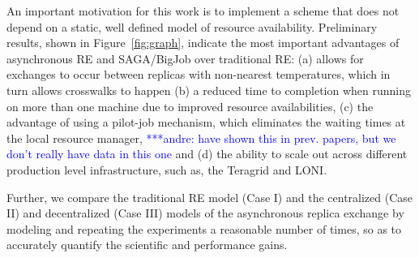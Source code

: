 \documentclass[a4paper,10pt]{article}
\newcommand{\jhanote}[1]{ {\textcolor{red} { ***shantenu: #1 }}}
\newcommand{\alnote}[1]{ {\textcolor{blue} { ***andre: #1 }}}
\newcommand{\athotanote}[1]{ {\textcolor{green} { ***athota: #1 }}}
\newcommand{\alnote}[1]{}
\newcommand{\jhanote}[1]{}
\newcommand{\athotanote}[1]{}
\begin{document}
An important motivation for this work is to implement a scheme that does not depend on a
static, well defined model of resource availability. %
Preliminary results, shown in Figure~\ref{fig:graph}, indicate the most important advantages of asynchronous RE and SAGA/BigJob over traditional RE: (a) allows for exchanges to occur between replicas with non-nearest temperatures, which in turn allows crosswalks to happen (b) a reduced time to completion when running on more than one machine due to improved resource availabilities, (c) the advantage of using a pilot-job mechanism, which eliminates the waiting times at the local resource manager, \alnote{have shown this in prev. papers, but we don't really have data in this one} and (d) the ability to scale out across different production level infrastructure, such as, the Teragrid and LONI.

Further, we compare the traditional RE model (Case I) and the centralized (Case II) and decentralized (Case III) models of the asynchronous replica exchange by modeling and repeating the experiments a reasonable number of times, so as to accurately quantify the scientific and performance gains. %


 
  
 
\end{document}
